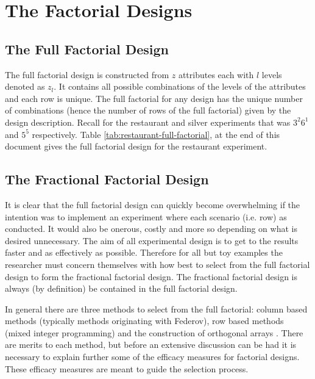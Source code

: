 \documentclass[article, crop=false]{standalone}
\begin{document}
\section{The Factorial Designs}
\subsection{The Full Factorial Design}

The full factorial design is constructed from $z$ attributes each with $l$ levels denoted as $z_l$.
It contains all possible combinations of the levels of the attributes and each row is unique.
The full factorial for any design has the unique number of combinations (hence the number of rows of the full factorial) given by the design description.
Recall for the restaurant and silver experiments that was $3^2 6^1$ and $5^5$ respectively.
Table \ref{tab:restaurant-full-factorial}, at the end of this document gives the full factorial design for the restaurant experiment.

\subsection{The Fractional Factorial Design}
It is clear that the full factorial design can quickly become overwhelming if the intention was to implement an experiment where each scenario (i.e. row) as conducted.
It would also be onerous, costly and more so depending on what is desired unnecessary.
The aim of all experimental design is to get to the results faster and as effectively as possible.
Therefore for all but toy examples the researcher must concern themselves with how best to select from the full factorial design to form the fractional factorial design.
The fractional factorial design is always (by definition) be contained in the full factorial design.


In general there are three methods to select from the full factorial: column based methods (typically methods originating with Federov), row based methods (mixed integer programming) and the construction of orthogonal arrays \citep{gromping2018DoE, kuhfeld2010marketingresearch}.
There are merits to each method, but before an extensive discussion can be had it is necessary to explain further some of the efficacy measures for factorial designs.
These efficacy measures are meant to guide the selection process.
\end{document}
